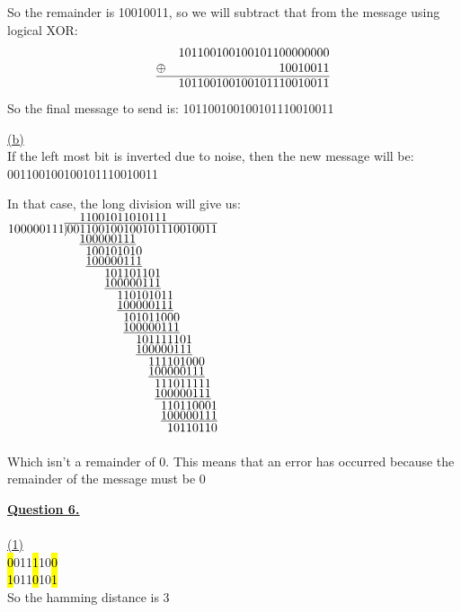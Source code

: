 \documentclass[12pt]{article}
\newcommand\showdiv[1]{\overline{\smash{\hstretch{.5}{)}\mkern-3.2mu\hstretch{.5}{)}}#1}}
\let\ph\phantom
\begin{document}
So the remainder is 10010011, so we will subtract that from the message using logical XOR:
\[
	\begin{array}{l@{\quad}cr@{}}
		 &        & 101100100100101100000000 \\
		 & \oplus & 10010011                 \\ \cline{2-3}
		 &        & 101100100100101110010011
	\end{array}
\]
So the final message to send is: 101100100100101110010011

\newpage
\hyperlink{toc}{\hypertarget{5.2}{(b)}}\\
If the left most bit is inverted due to noise, then the new message will be: 001100100100101110010011

In that case, the long division will give us:\\

\(
\setstackgap{S}{1.5pt}
\stackMath\def\stackalignment{r}
\stackunder{%
100000111 \stackon[1pt]{\showdiv{001100100100101110010011}}{11001011010111\ph{00000000}}%
}{%
\Shortstack[l]{{\underline{100000111}\ph{0101100000000}}
\ph{0}10010101{0} \ph{0}\underline{100000111}
\ph{0000}101101{101} \ph{0000}\underline{100000111}
\ph{000000}1101010{11} \ph{000000}\underline{100000111}
\ph{0000000}10101100{0} \ph{0000000}\underline{100000111}
\ph{000000000}1011111{01} \ph{000000000}\underline{100000111}
\ph{00000000000}1111010{00} \ph{00000000000}\underline{100000111}
\ph{000000000000}11101111{1} \ph{000000000000}\underline{100000111}
\ph{0000000000000}11011000{1} \ph{0000000000000}\underline{100000111}
\ph{00000000000000}10110110{}
}
}
\)
~\\\\

Which isn't a remainder of 0. This means that an error has occurred because the remainder of the message must be 0
\newpage

\hyperlink{toc}{\LARGE \underline{\textbf{Question 6.}}}\\
~\\\hyperlink{toc}{\hypertarget{6.1}{(1)}}\\
\hl{0}011\hl{1}10\hl{0}\\[-2.5mm]
\hl{1}011\hl{0}10\hl{1}\\

So the hamming distance is 3
\end{document}
